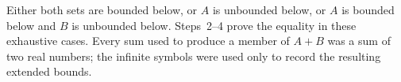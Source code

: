 Either both sets are bounded below, or $A$ is unbounded below, or
$A$ is bounded below and $B$ is unbounded below. Steps~2--4 prove
the equality in these exhaustive cases. Every sum used to produce a
member of $A+B$ was a sum of two real numbers; the infinite symbols
were used only to record the resulting extended bounds.

